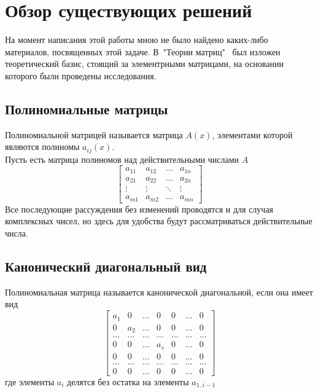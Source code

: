 \documentclass[14pt, a4paper]{extreport}
\begin{document}
\chapter{Обзор существующих решений}
	На момент написания этой работы мною не было найдено каких-либо материалов, посвященных этой задаче.
	В\ "Теории матриц"\ \cite{gantmaher} был изложен теоретический базис, стоящий за элементрными матрицами,
	на основании которого были проведены исследования.\\

	\section{Полиномиальные матрицы}
	Полиномиальной матрицей называется матрица $A(x)$, элементами которой являются полиномы
	$a_{ij}(x)$.\\
	Пусть есть матрица полиномов над действительными числами $A$
	\[
		\begin{bmatrix}
			a_{11} & a_{12} & \dots & a_{1n} \\
			a_{21} & a_{22} & \dots & a_{2n} \\
			\vdots & \vdots & \ddots & \vdots \\
			a_{m1} & a_{m2} & \dots & a_{mn}
		\end{bmatrix}
	\]
	Все последующие рассуждения без изменений проводятся и для случая комплексных чисел, но здесь
	для удобства будут рассматриваться действительные числа.

	\section{Канонический диагональный вид}
	Полиномиальная матрица называется
	канонической диагональной, если она имеет вид
	\[
		\begin{bmatrix}
			a_{1} & 0 & \dots & 0 & 0 & \dots & 0 \\
			0 & a_{2} & \dots & 0 & 0 & \dots & 0 \\
			\dots & \dots & \dots & \dots & \dots & \dots & \dots \\
			0 & 0 & \dots & a_{s} & 0 & \dots & 0 \\
			0 & 0 & \dots & 0 & 0 & \dots & 0 \\
			\dots & \dots & \dots & \dots & \dots & \dots & \dots \\
			0 & 0 & \dots & 0 & 0 & \dots & 0
		\end{bmatrix}
	\]
	где элементы $a_i$ делятся без остатка на элементы $a_{1..i-1}$
\end{document}
